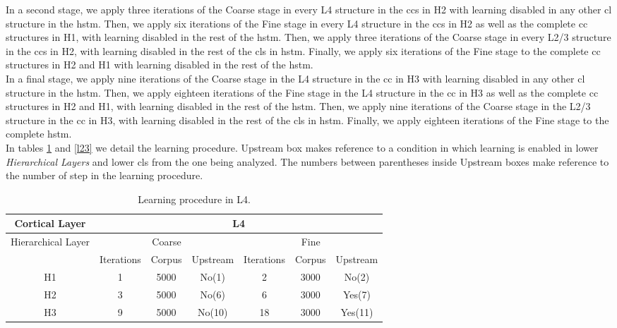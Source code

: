 \documentclass[11pt,a4paper]{article}
\begin{document}
\begin{appendices}
In a second stage, we apply three iterations of the Coarse stage
in every L4 structure in the \ac{cc}s in H2 with learning
disabled in any other \ac{cl} structure in the \ac{hstm}.
Then, we apply six iterations of the Fine stage in every L4
structure in the \ac{cc}s in H2 as well as the complete \ac{cc}
structures in H1, with learning disabled in the rest of the \ac{hstm}.
Then, we apply three iterations of the Coarse stage in every L2/3 structure
in the \ac{cc}s in H2, with learning disabled in the rest of the
\ac{cl}s in \ac{hstm}.
Finally, we apply six iterations of the Fine stage to the complete \ac{cc}
structures in H2 and H1 with learning disabled in the rest of the \ac{hstm}.\\

In a final stage, we apply nine iterations of the Coarse stage
in the L4 structure in the \ac{cc} in H3 with learning
disabled in any other \ac{cl} structure in the \ac{hstm}.
Then, we apply eighteen iterations of the Fine stage in the L4
structure in the \ac{cc} in H3 as well as the complete \ac{cc}
structures in H2 and H1, with learning disabled in the rest of the \ac{hstm}.
Then, we apply nine iterations of the Coarse stage in the L2/3 structure
in the \ac{cc} in H3, with learning disabled in the rest of the
\ac{cl}s in \ac{hstm}.
Finally, we apply eighteen iterations of the Fine stage to the complete \ac{hstm}.\\

In tables \ref{l4} and \ref{l23} we detail the learning procedure.
Upstream box makes reference to a condition in which learning is enabled in
lower \textit{Hierarchical Layers} and lower \ac{cl}s from the one being analyzed.
The numbers between parentheses inside Upstream boxes make reference to
the number of step in the learning procedure.

\begin{table}[h!]
\centering
\begin{tabular}{ |c|c|c|c|c|c|c| }
\hline
\scriptsize{Cortical Layer} & \multicolumn{6}{|c|}{L4} \\
\hline
\scriptsize{Hierarchical Layer} & \multicolumn{3}{|c|}{\scriptsize{Coarse}} & \multicolumn{3}{|c|}{\scriptsize{Fine}}\\
\hline
 & \scriptsize{Iterations} & \scriptsize{Corpus} & \scriptsize{Upstream} & \scriptsize{Iterations} & \scriptsize{Corpus} & \scriptsize{Upstream}\\
\hline
H1 & 1 & 5000 & No(1) & 2 & 3000 & No(2)\\
\hline
H2 & 3 & 5000 & No(6) & 6 & 3000 & Yes(7)\\
\hline
H3 & 9 & 5000 & No(10) & 18 & 3000 & Yes(11)\\
\hline
\end{tabular}
\caption{Learning procedure in L4.}
\label{l4}
\end{table}


\end{appendices}
\end{document}
